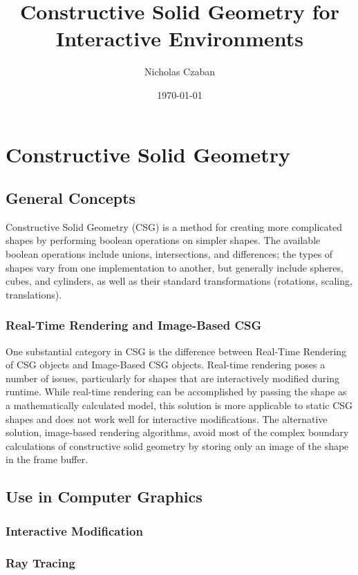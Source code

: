 \documentclass[12pt]{article}
\begin{document}
\title{Constructive Solid Geometry for Interactive Environments}
\author{Nicholas Czaban}
\date{\today}
\maketitle

\section{Constructive Solid Geometry}
\subsection{General Concepts}
\indent Constructive Solid Geometry (CSG) is a method for creating more complicated shapes by performing boolean operations on simpler shapes. The available boolean operations include unions, intersections, and differences; the types of shapes vary from one implementation to another, but generally include spheres, cubes, and cylinders, as well as their standard transformations (rotations, scaling, translations)\cite{cs_dictionary}. 
\subsubsection{Real-Time Rendering and Image-Based CSG}
\indent One substantial category in CSG is the difference between Real-Time Rendering of CSG objects and Image-Based CSG objects. Real-time rendering poses a number of issues, particularly for shapes that are interactively modified during runtime. While real-time rendering can be accomplished by passing the shape as a mathematically calculated model, this solution is more applicable to static CSG shapes and does not work well for interactive modifications\cite{open_csg}. The alternative solution, image-based rendering algorithms, avoid most of the complex boundary calculations of constructive solid geometry by storing only an image of the shape in the frame buffer\cite{open_csg}. 
\subsection{Use in Computer Graphics}
\subsubsection{Interactive Modification}
\subsubsection{Ray Tracing}
\end{document}
